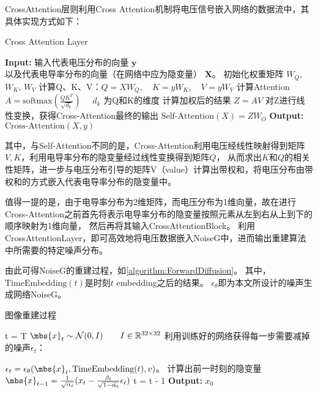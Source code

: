 CrossAttention层则利用Cross Attention机制将电压信号嵌入网络的数据流中，其具体实现方式如下：

\begin{algorithm}[h]
    
    \caption{Cross Attention Layer}
    \begin{algorithmic}[1]
        \State \textbf{Input:} 输入代表电压分布的向量 $\boldsymbol{y}$\\
        以及代表电导率分布的向量（在网络中应为隐变量） $\boldsymbol{X}$。
        \State 初始化权重矩阵 $W_Q$, $W_K$, $W_V$
        \State 计算Q、K、V：$Q = XW_Q, \quad K = yW_K, \quad V = yW_V$
        \State 计算Attention  $A = \text{softmax}\left(\frac{QK^T}{\sqrt{d_k}}\right) \quad $ $d_k$ 为Q和K的维度 
        \State 计算加权后的结果 $Z = AV$
        \State 对Z进行线性变换，获得Cross-Attention最终的输出  $\text{Self-Attention}(X) = ZW_O$
        \State \textbf{Output:} $\text{Cross-Attention}(X, y)$
    \end{algorithmic}
    \label{algorithm:CrossAttention}
\end{algorithm}

其中，与Self-Attention不同的是，Cross-Attention利用电压经线性映射得到矩阵$V, K$，利用电导率分布的隐变量经过线性变换得到矩阵$Q$，
从而求出$K$和$Q$的相关性矩阵，进一步与电压分布引导的矩阵V（value）计算出带权和，将电压分布由带权和的方式嵌入代表电导率分布的隐变量中。

值得一提的是，由于电导率分布为2维矩阵，而电压分布为1维向量，故在进行Cross-Attention之前首先将表示电导率分布的隐变量按照元素从左到右从上到下的顺序映射为1维向量，
然后再将其输入CrossAttentionBlock。
利用CrossAttentionLayer，即可高效地将电压数据嵌入NoiseG中，进而输出重建算法中所需要的特定噪声分布。

由此可得NoiseG的重建过程，如\cref{algorithm:ForwardDiffusion}。
其中，$\text{TimeEmbedding}(t)$是时刻$t$ embedding之后的结果。
$\epsilon_\theta$即为本文所设计的噪声生成网络NoiseG。
\begin{algorithm}[H]
    
    \caption{图像重建过程}
    \begin{algorithmic}[1]

        \State t = T
        \State $\mbs{x}_t \sim \mathcal{N}(0, I) \qquad I \in \mathbb{R}^{32 \times 32}$
        \State 利用训练好的网络获得每一步需要减掉的噪声$\epsilon_t$：
        
        $\epsilon_t = \epsilon_\theta(\mbs{x}_t, \text{TimeEmbedding}(t), v)$。
        \State 计算出前一时刻的隐变量$\mbs{x}_{t-1} = \frac{1}{\sqrt{\alpha_t}}(x_t - \frac{\beta_t}{\sqrt{1-\hat{\alpha_t}}}\epsilon_t)$
        \State t = t - 1
        \EndWhile
        \State \textbf{Output:} $x_0$
    \end{algorithmic}
    \label{algorithm:ForwardDiffusion}
\end{algorithm}

